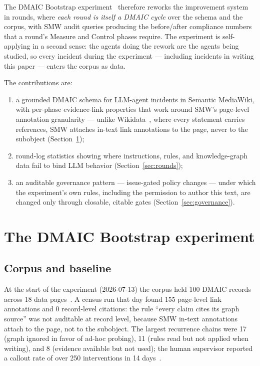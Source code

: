 \documentclass[
]{ceurart}
\begin{document}
The DMAIC Bootstrap experiment~\cite{dmaicbootstrap} therefore reworks the
improvement system in rounds, where \emph{each round is itself a DMAIC
cycle} over the schema and the corpus, with SMW audit queries producing
the before/after compliance numbers that a round's Measure and Control
phases require. The experiment is self-applying in a second sense: the
agents doing the rework are the agents being studied, so every incident
during the experiment --- including incidents in writing this paper ---
enters the corpus as data.

The contributions are:
\begin{enumerate}
\item a grounded DMAIC schema for LLM-agent incidents in Semantic
  MediaWiki, with per-phase evidence-link properties that work around
  SMW's page-level annotation granularity --- unlike
  Wikidata~\cite{vrandecic2014wikidata}, where every statement carries
  references, SMW attaches in-text link annotations to the page, never to
  the subobject (Section~\ref{sec:experiment});
\item round-log statistics showing where instructions, rules, and
  knowledge-graph data fail to bind LLM behavior
  (Section~\ref{sec:rounds});
\item an auditable governance pattern --- issue-gated policy changes ---
  under which the experiment's own rules, including the permission to
  author this text, are changed only through closable, citable gates
  (Section~\ref{sec:governance}).
\end{enumerate}

\section{The DMAIC Bootstrap experiment}\label{sec:experiment}

\subsection{Corpus and baseline}
At the start of the experiment (2026-07-13) the corpus held 100 DMAIC
records across 18 data pages~\cite{dmaicbootstrap}. A census run that day
found 155 page-level link annotations and 0 record-level citations: the
rule ``every claim cites its graph source'' was not auditable at record
level, because SMW in-text annotations attach to the page, not to the
subobject. The largest recurrence chains were 17 (graph ignored in favor
of ad-hoc probing), 11 (rules read but not applied when writing), and 8
(evidence available but not used); the human supervisor reported a callout
rate of over 250 interventions in 14 days~\cite{dmaicbootstrap}.
\end{document}
